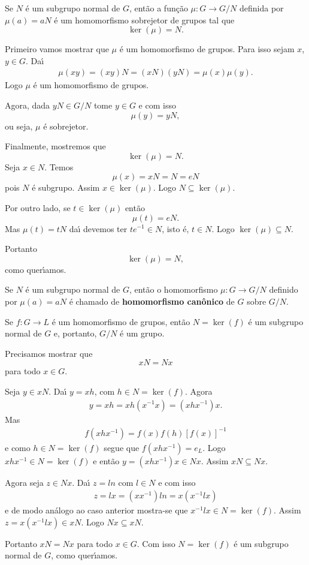 \begin{proposicao}
    Se $N$ \'e um subgrupo normal de $G$, ent\~ao a fun\c{c}\~ao $\mu : G \to G/N$ definida por $\mu(a) = aN$ \'e um homomorfismo sobrejetor de grupos tal que
    \[
        \ker(\mu) = N.
    \]
\end{proposicao}
\begin{prova}
	Primeiro vamos mostrar que $\mu$ \'e um homomorfismo de grupos. Para isso sejam $x$, $y \in G$. Da{\'\i}
	\begin{align*}
		\mu(xy) = (xy)N = (xN)(yN) = \mu(x)\mu(y).
	\end{align*}
	Logo $\mu$ \'e um homomorfismo de grupos.

	Agora, dada $yN \in G/N$ tome $y \in G$ e com isso
	\[
		\mu(y) = yN,
	\]
	ou seja, $\mu$ \'e sobrejetor.

	Finalmente, mostremos que
	\[
		\ker(\mu) = N.
	\]
	Seja $x \in N$. Temos
	\[
		\mu(x) = xN = N = eN
	\]
	pois $N$ \'e subgrupo. Assim $x \in \ker(\mu)$. Logo $N \subseteq \ker(\mu)$.

	Por outro lado, se $t \in \ker(\mu)$ ent\~ao
	\[
		\mu(t) = eN.
	\]
	Mas $\mu(t) = tN$ da{\'\i} devemos ter $te^{-1} \in N$, isto \'e, $t \in N$. Logo $\ker(\mu) \subseteq N$.

	Portanto
	\[
		\ker(\mu) = N,
	\]
	como quer{\'\i}amos.
\end{prova}

\begin{definicao}
    Se $N$ \'e um subgrupo normal de $G$, ent\~ao o homomorfismo $\mu : G \to G/N$ definido por $\mu(a) = aN$ \'e chamado de \textbf{homomorfismo can\^onico} de $G$ sobre $G/N$.
\end{definicao}

\begin{lema}
    Se $f : G \to L$ \'e um homomorfismo de grupos, ent\~ao $N = \ker(f)$ \'e um subgrupo normal de $G$ e, portanto, $G/N$ \'e um grupo.
\end{lema}
\begin{prova}
	Precisamos mostrar que
	\[
		xN = Nx
	\]
	para todo $x \in G$.

	Seja $y \in xN$. Da{\'\i} $y = xh$, com $h \in N = \ker(f)$. Agora
	\begin{align*}
		y = xh = xh(x^{-1}x) = (xhx^{-1})x.
	\end{align*}
	Mas
	\begin{align*}
		f(xhx^{-1}) = f(x)f(h)[f(x)]^{-1}
	\end{align*}
	e como $h \in N = \ker(f)$ segue que $f(xhx^{-1}) = e_L$. Logo $xhx^{-1} \in N = \ker(f)$ e ent\~ao $y = (xhx^{-1})x \in Nx$. Assim $xN \subseteq Nx$.

	Agora seja $z \in Nx$. Da{\'\i} $z = ln$ com $l \in N$ e com isso
	\begin{align*}
		z = lx = (xx^{-1})ln = x(x^{-1}lx)
	\end{align*}
	e de modo an\'alogo ao caso anterior mostra-se que $x^{-1}lx \in N = \ker(f)$. Assim $z = x(x^{-1}lx) \in xN$. Logo $Nx \subseteq xN$.

	Portanto $xN = Nx$ para todo $x \in G$. Com isso $N = \ker(f)$ \'e um subgrupo normal de $G$, como quer{\'\i}amos.
\end{prova}

